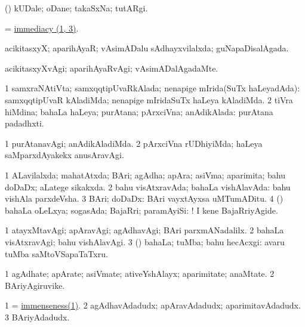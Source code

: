 \bentry
{}
\gl{\saMavayx}
\bmng
(\AmA) kUDale; oDane; takaSxNa; tutARgi. 
\emng
\eentry

\bentry
{}
\gl{\nA}
\bmng
 = \hyperlink{immediacy}{immediacy (1, 3)}. 
\emng
\eentry

\bentry
{}
\gl{\gu}
\bmng
acikitasxyX; aparihAyaR; vAsimADalu sAdhayxvilalxda; guNapaDisalAgada. 
\emng
\eentry

\bentry
{}
\gl{\kirxvi}
\bmng
acikitasxyXvAgi; aparihAyaRvAgi; vAsimADalAgadaMte. 
\emng
\eentry

\bentry
{}
\gl{\gu}
\bmng
\bnum
\num{1} samxraNAtiVta; samxqqtipUvaRkAlada; nenapige mIrida(SuTx haLeyadAda):  samxqqtipUvaR kAladiMda; nenapige mIridaSuTx haLeya kAladiMda. 
\num{2} tiVra hiMdina; bahaLa haLeya; purAtana; pArxciVna; anAdikAlada:  purAtana padadhxti. 
\enum
\emng
\eentry

\bentry
{}
\gl{\kirxvi}
\bmng
\bnum
\num{1} purAtanavAgi; anAdikAladiMda. 
\num{2} pArxciVna rUDhiyiMda; haLeya saMparxdAyakekx anusAravAgi. 
\enum
\emng
\eentry

\bentry
{}
\gl{\gu}
\bmng
\bnum
\num{1} ALavilalxda; mahatAtxda; BAri; agAdha; apAra; asiVma; aparimita; bahu doDaDx; aLatege sikakxda. 
\num{2} bahu visAtxravAda; bahaLa vishAlavAda:  bahu vishAla parxdeVsha. 
\num{3} BAri; doDaDx:  BAri vayxtAyxsa uMTumADitu. 
\num{4} (\ashi) bahaLa oLeLxya; sogasAda; BajaRri; paramAyiSi: ! I kene BajaRriyAgide. 
\enum
\emng
\eentry

\bentry
{}
\gl{\kirxvi}
\bmng
\bnum
\num{1} atayxMtavAgi; apAravAgi; agAdhavAgi; BAri parxmANadalilx. 
\num{2} bahaLa visAtxravAgi; bahu vishAlavAgi. 
\num{3} (\AmA) bahaLa; tuMba; bahu hecAcxgi:  avaru tuMba saMtoVSapaTaTxru. 
\enum
\emng
\eentry

\bentry
{}
\gl{\nA}
\bmng
\bnum
\num{1} agAdhate; apArate; asiVmate; ativeYshAlayx; aparimitate; anaMtate. 
\num{2} BAriyAgiruvike. 
\enum
\emng
\eentry

\bentry
{}
\gl{\nA}
\bmng
\bnum
\num{1}  = \hyperlink{immenseness}{immenseness(1)}. 
\num{2} agAdhavAdadudx; apAravAdadudx; aparimitavAdadudx. 
\num{3} BAriyAdadudx. 
\enum
\emng
\eentry

